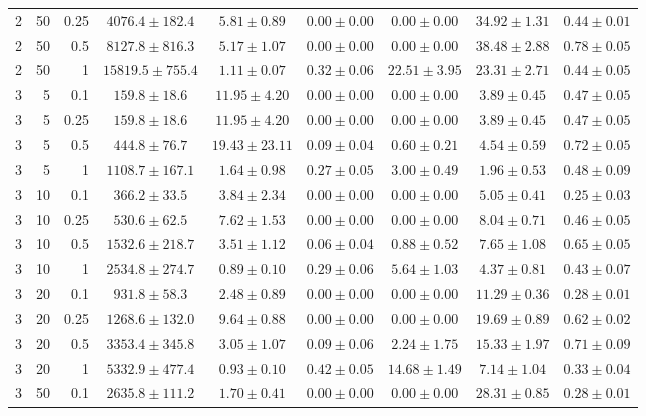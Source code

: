 \begin{table}[htbp]
\begin{tabular}{@{}rrrcccccc@{}}
2 & 50 & 0.25 & $4076.4 \pm 182.4$ & $5.81 \pm 0.89$ & $0.00 \pm 0.00$ & $0.00 \pm 0.00$ & $34.92 \pm 1.31$ & $0.44 \pm 0.01$ \\
2 & 50 & 0.5 & $8127.8 \pm 816.3$ & $5.17 \pm 1.07$ & $0.00 \pm 0.00$ & $0.00 \pm 0.00$ & $38.48 \pm 2.88$ & $0.78 \pm 0.05$ \\
2 & 50 & 1 & $15819.5 \pm 755.4$ & $1.11 \pm 0.07$ & $0.32 \pm 0.06$ & $22.51 \pm 3.95$ & $23.31 \pm 2.71$ & $0.44 \pm 0.05$ \\
\midrule
3 & 5 & 0.1 & $159.8 \pm 18.6$ & $11.95 \pm 4.20$ & $0.00 \pm 0.00$ & $0.00 \pm 0.00$ & $3.89 \pm 0.45$ & $0.47 \pm 0.05$ \\
3 & 5 & 0.25 & $159.8 \pm 18.6$ & $11.95 \pm 4.20$ & $0.00 \pm 0.00$ & $0.00 \pm 0.00$ & $3.89 \pm 0.45$ & $0.47 \pm 0.05$ \\
3 & 5 & 0.5 & $444.8 \pm 76.7$ & $19.43 \pm 23.11$ & $0.09 \pm 0.04$ & $0.60 \pm 0.21$ & $4.54 \pm 0.59$ & $0.72 \pm 0.05$ \\
3 & 5 & 1 & $1108.7 \pm 167.1$ & $1.64 \pm 0.98$ & $0.27 \pm 0.05$ & $3.00 \pm 0.49$ & $1.96 \pm 0.53$ & $0.48 \pm 0.09$ \\
3 & 10 & 0.1 & $366.2 \pm 33.5$ & $3.84 \pm 2.34$ & $0.00 \pm 0.00$ & $0.00 \pm 0.00$ & $5.05 \pm 0.41$ & $0.25 \pm 0.03$ \\
3 & 10 & 0.25 & $530.6 \pm 62.5$ & $7.62 \pm 1.53$ & $0.00 \pm 0.00$ & $0.00 \pm 0.00$ & $8.04 \pm 0.71$ & $0.46 \pm 0.05$ \\
3 & 10 & 0.5 & $1532.6 \pm 218.7$ & $3.51 \pm 1.12$ & $0.06 \pm 0.04$ & $0.88 \pm 0.52$ & $7.65 \pm 1.08$ & $0.65 \pm 0.05$ \\
3 & 10 & 1 & $2534.8 \pm 274.7$ & $0.89 \pm 0.10$ & $0.29 \pm 0.06$ & $5.64 \pm 1.03$ & $4.37 \pm 0.81$ & $0.43 \pm 0.07$ \\
3 & 20 & 0.1 & $931.8 \pm 58.3$ & $2.48 \pm 0.89$ & $0.00 \pm 0.00$ & $0.00 \pm 0.00$ & $11.29 \pm 0.36$ & $0.28 \pm 0.01$ \\
3 & 20 & 0.25 & $1268.6 \pm 132.0$ & $9.64 \pm 0.88$ & $0.00 \pm 0.00$ & $0.00 \pm 0.00$ & $19.69 \pm 0.89$ & $0.62 \pm 0.02$ \\
3 & 20 & 0.5 & $3353.4 \pm 345.8$ & $3.05 \pm 1.07$ & $0.09 \pm 0.06$ & $2.24 \pm 1.75$ & $15.33 \pm 1.97$ & $0.71 \pm 0.09$ \\
3 & 20 & 1 & $5332.9 \pm 477.4$ & $0.93 \pm 0.10$ & $0.42 \pm 0.05$ & $14.68 \pm 1.49$ & $7.14 \pm 1.04$ & $0.33 \pm 0.04$ \\
3 & 50 & 0.1 & $2635.8 \pm 111.2$ & $1.70 \pm 0.41$ & $0.00 \pm 0.00$ & $0.00 \pm 0.00$ & $28.31 \pm 0.85$ & $0.28 \pm 0.01$ \\

\end{tabular}
\end{table}
